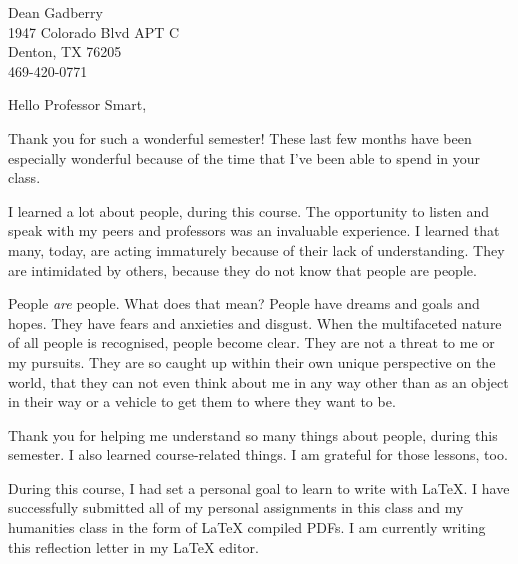 \documentclass[12pt,a4paper,english]{article}
\begin{document}
\begin{flushleft}

Dean Gadberry\\
1947 Colorado Blvd APT C\\
Denton, TX 76205\\
469-420-0771

\par
\hfill\break
Hello Professor Smart,

Thank you for such a wonderful semester! These last few months have been especially wonderful because of the time that I've been able to spend in your class. 

I learned a lot about people, during this course. The opportunity to listen and speak with my peers and professors was an invaluable experience. I learned that many, today, are acting immaturely because of their lack of understanding. They are intimidated by others, because they do not know that people are people. 

People \emph{are} people. What does that mean? People have dreams and goals and hopes. They have fears and anxieties and disgust. When the multifaceted nature of all people is recognised, people become clear. They are not a threat to me or my pursuits. They are so caught up within their own unique perspective on the world, that they can not even think about me in any way other than as an object in their way or a vehicle to get them to where they want to be.

Thank you for helping me understand so many things about people, during this semester. I also learned course-related things. I am grateful for those lessons, too.

During this course, I had set a personal goal to learn to write with \LaTeX{}. I have successfully submitted all of my personal assignments in this class and my humanities class in the form of \LaTeX{} compiled PDFs. I am currently writing this reflection letter in my \LaTeX{} editor.






\end{flushleft}
\end{document}
